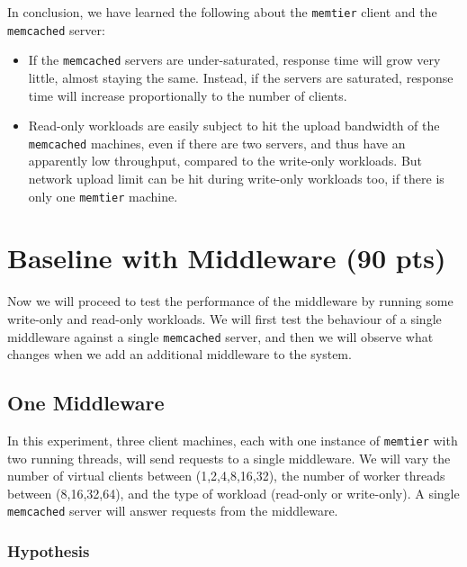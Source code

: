 \documentclass[11pt,a4paper]{article}
\renewcommand{\t}[1]{%
	{\texttt{#1}}}
\begin{document}
In conclusion, we have learned the following about the \t{memtier} client and the \t{memcached} server:
\begin{itemize}
	\item If the \t{memcached} servers are under-saturated, response time will
		grow very little, almost staying the same. Instead, if the servers are
		saturated, response time will increase proportionally
		to the number of clients.
	\item Read-only workloads are easily subject to hit the upload bandwidth
		of the \t{memcached} machines, even if there are two servers, and thus
		have an apparently low throughput, compared to the write-only workloads.
		But network upload limit can be hit during write-only workloads too, 
		if there is only one \t{memtier} machine.
\end{itemize}




















\section{Baseline with Middleware (90 pts)}

Now we will proceed to test the performance of the middleware
by running some write-only and read-only workloads.  We will first test
the behaviour of a single middleware against a single \t{memcached} server, and
then we will observe what changes when we add an additional middleware to the
system.

\subsection{One Middleware}

In this experiment, three client machines, each with one instance of
\t{memtier} with two running threads, will send requests to a single
middleware. 
We will vary the number of virtual clients between (1,2,4,8,16,32), the number
of worker threads between (8,16,32,64), and the type of workload (read-only or
write-only). A single \t{memcached} server will answer
requests from the middleware.


\subsubsection{Hypothesis}
\end{document}
